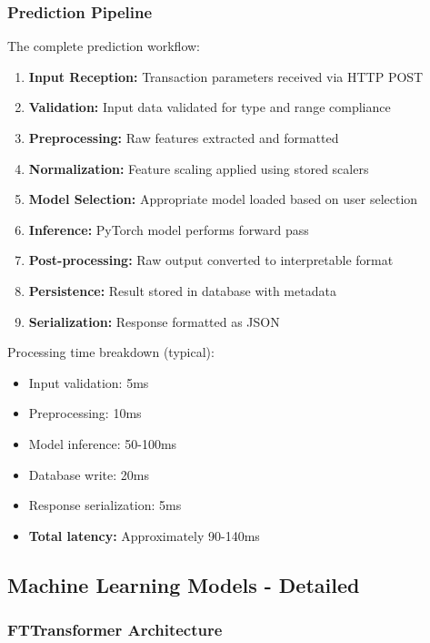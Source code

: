 \documentclass[12pt,a4paper,twoside]{report}
\begin{document}
\subsubsection{Prediction Pipeline}

The complete prediction workflow:

\begin{enumerate}
    \item \textbf{Input Reception:} Transaction parameters received via HTTP POST
    \item \textbf{Validation:} Input data validated for type and range compliance
    \item \textbf{Preprocessing:} Raw features extracted and formatted
    \item \textbf{Normalization:} Feature scaling applied using stored scalers
    \item \textbf{Model Selection:} Appropriate model loaded based on user selection
    \item \textbf{Inference:} PyTorch model performs forward pass
    \item \textbf{Post-processing:} Raw output converted to interpretable format
    \item \textbf{Persistence:} Result stored in database with metadata
    \item \textbf{Serialization:} Response formatted as JSON
\end{enumerate}

Processing time breakdown (typical):

\begin{itemize}
    \item Input validation: 5ms
    \item Preprocessing: 10ms
    \item Model inference: 50-100ms
    \item Database write: 20ms
    \item Response serialization: 5ms
    \item \textbf{Total latency:} Approximately 90-140ms
\end{itemize}

\subsection{Machine Learning Models - Detailed}

\subsubsection{FTTransformer Architecture}
\end{document}
